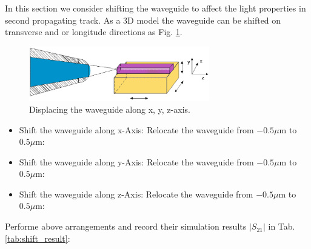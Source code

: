 
In this section we consider shifting the waveguide to affect the light properties in second propagating track. As a 3D model the waveguide can be shifted on transverse and or longitude directions as Fig. \ref{fig:shift_all_axis}.
\begin{figure}[!ht]
\centering
\includegraphics[width=0.7\textwidth]{bilder/shift_all_axis}
\caption{Displacing the waveguide along x, y, z-axis.}
\label{fig:shift_all_axis}
\end{figure}

\begin{itemize}
\item Shift the waveguide along x-Axis: Relocate the waveguide from $-0.5\mu$m to $0.5\mu$m:
\item Shift the waveguide along y-Axis: Relocate the waveguide from $-0.5\mu$m to $0.5\mu$m:
\item Shift the waveguide along z-Axis: Relocate the waveguide from $-0.5\mu$m to $0.5\mu$m:
\end{itemize}
Performe above arrangements and record their simulation results $|S_{21}|$ in Tab. \ref{tab:shift_result}:\\

